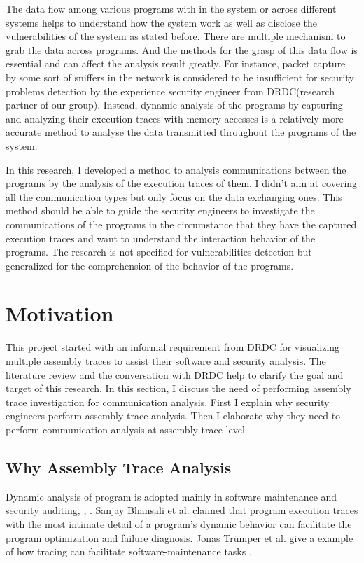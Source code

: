 The data flow among various programs with in the system or across different systems helps to understand how the system work as well as disclose the vulnerabilities of the system as stated before. There are multiple mechanism to grab the data across programs. And the methods for the grasp of this data flow is essential and can affect the analysis result greatly. For instance, packet capture by some sort of sniffers in the network is considered to be insufficient for security problems detection by the experience security engineer from DRDC(research partner of our group). Instead, dynamic analysis of the programs by capturing and analyzing their execution traces with memory accesses is a relatively more accurate method to analyse the data transmitted throughout the programs of the system. 

In this research, I developed a method to analysis communications between the programs by the analysis of the execution traces of them. I didn't aim at covering all the communication types but only focus on the data exchanging ones. This method should be able to guide the security engineers to investigate the communications of the programs in the circumstance that they have the captured execution traces and want to understand the interaction behavior of the programs. The research is not specified for vulnerabilities detection but generalized for the comprehension of the behavior of the programs.

\section{Motivation}
This project started with an informal requirement from DRDC for visualizing multiple assembly traces to assist their software and security analysis. The literature review and the conversation with DRDC help to clarify the goal and target of this research. In this section, I discuss the need of performing assembly trace investigation for communication analysis. First I explain why security engineers perform assembly trace analysis. Then I elaborate why they need to perform communication analysis at assembly trace level. 

\subsection{Why Assembly Trace Analysis}
Dynamic analysis of program is adopted mainly in software maintenance and security auditing\cite{zhang2010detecting}, \cite{cai2016sworddta}, \cite{somorovsky2016systematic}. Sanjay Bhansali et al. claimed that program execution traces with the most intimate detail of a program's dynamic behavior can facilitate the program optimization and failure diagnosis. Jonas Tr{\"u}mper et al. give a example of how tracing can facilitate software-maintenance tasks \cite{trumper2012maintenance}.

